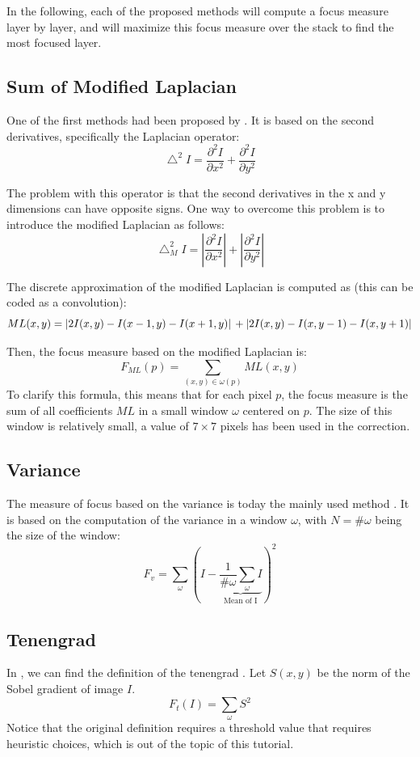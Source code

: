 In the following, each of the proposed methods will compute a focus measure layer by layer, and will maximize this focus measure over the stack to find the most focused layer. 

\subsection{Sum of Modified Laplacian}
One of the first methods had been proposed by \cite{Nayar1994}. It is based on the second derivatives, specifically the Laplacian operator:
$$\bigtriangleup^2 I = \frac{\partial^2 I}{\partial x^2} + \frac{\partial^2 I}{\partial y^2}$$

The problem with this operator is that the second derivatives in the x and y dimensions can have opposite signs. One way to overcome this problem is to introduce the modified Laplacian as follows:
$$\bigtriangleup_M^2 I = \left|\frac{\partial^2 I}{\partial x^2}\right| + \left|\frac{\partial^2 I}{\partial y^2}\right|$$

The discrete approximation of the modified Laplacian is computed as (this can be coded as a convolution):
\[ML(x, y)= \left| 2I(x,y)-I(x-1, y)-I(x+1,y)\right| \\
+ \left| 2I(x,y)-I(x, y-1)-I(x,y+1)\right|
\]
                                                                                                             

Then, the focus measure based on the modified Laplacian is:
$$F_{ML}(p) = \displaystyle{\sum_{(x,y)\in\omega(p)}}ML(x,y)$$
To clarify this formula, this means that for each pixel $p$, the focus measure is the sum of all coefficients $ML$ in a small window $\omega$ centered on $p$. The size of this window is relatively small, a value of $7\times 7$ pixels has been used in the correction.

\subsection{Variance}
The measure of focus based on the variance is today the mainly used method \cite{Groen1985,Sugimoto1985}. It is based on the computation of the variance in a window $\omega$, with $N=\#\omega$ being the size of the window:
$$F_v=\displaystyle{\sum_\omega} \left( I -\underbrace{\frac{1}{\#\omega} \displaystyle{\sum_\omega} I}_{\textrm{Mean of I}}\right)^2$$

\subsection{Tenengrad}
In \cite{Krotkov1988}, we can find the definition of the tenengrad \cite{Tenenbaum1970}. Let $S(x,y)$ be the norm of the Sobel gradient of image $I$.
$$F_t(I)=\displaystyle\sum_\omega S^2$$
Notice that the original definition requires a threshold value that requires heuristic choices, which is out of the topic of this tutorial.

